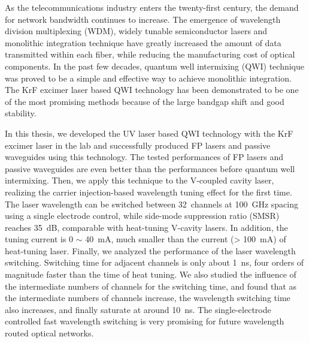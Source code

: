 \documentclass{ZJUthesis}
\begin{document}
\begin{englishabstract}

As the telecommunications industry enters the twenty-first century, the demand for network bandwidth continues to increase. The emergence of wavelength division multiplexing (WDM), widely tunable semiconductor lasers and monolithic integration technique have greatly increased the amount of data transmitted within each fiber, while reducing the manufacturing cost of optical components. In the past few decades, quantum well intermixing (QWI) technique was proved to be a simple and effective way to achieve monolithic integration. The KrF excimer laser based QWI technology has been demonstrated to be one of the most promising methods because of the large bandgap shift and good stability.

In this thesis, we developed the UV laser based QWI technology with the KrF excimer laser in the lab and successfully produced FP lasers and passive waveguides using this technology. The tested performances of FP lasers and passive waveguides are even better than the performances before quantum well intermixing. Then, we apply this technique to the V-coupled cavity laser, realizing the carrier injection-based wavelength tuning effect for the first time. The laser wavelength can be switched between 32~channels at 100~GHz spacing using a single electrode control, while side-mode suppression ratio (SMSR) reaches 35~dB, comparable with heat-tuning V-cavity lasers. In addition, the tuning current is 0 $\sim$ 40~mA, much smaller than the current (> 100~mA) of heat-tuning laser. Finally, we analyzed the performance of the laser wavelength switching. Switching time for adjacent channels is only about 1~ns, four orders of magnitude faster than the time of heat tuning. We also studied the influence of the intermediate numbers of channels for the switching time, and found that as the intermediate numbers of channels increase, the wavelength switching time also increases, and finally saturate at around 10~ns. The single-electrode controlled fast wavelength switching is very promising for future wavelength routed optical networks.

\end{englishabstract}
\ZJUcontents
\ZJUmainmatter
\end{document}
